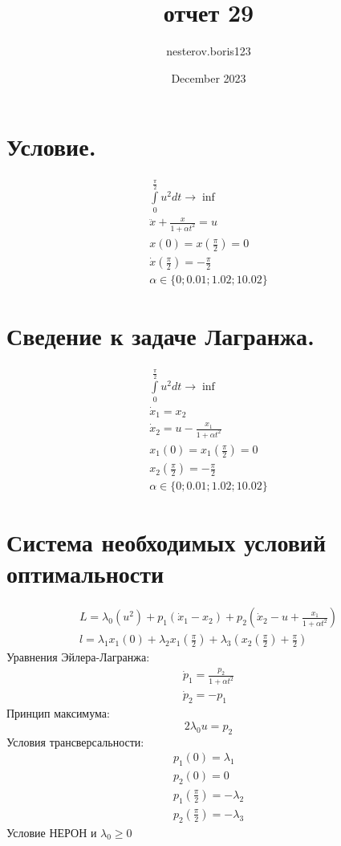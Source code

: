 \documentclass{article}
\title{отчет 29}
\author{nesterov.boris123 }
\date{December 2023}
\begin{document}
\section{Условие.}
\begin{gather*}
 \int\limits_{0}^{\frac \pi 2}u^{2} dt \rightarrow \inf\\
 \ddot x + \frac{x}{1 + \alpha t^{2}} = u\\
  x(0) = x(\frac \pi 2) = 0\\
  \dot{x}(\frac \pi 2) = -\frac \pi 2\\
  \alpha \in \{0;0.01;1.02;10.02\}
\end{gather*}
\section{Сведение к задаче Лагранжа.}
\begin{gather*}
 \int\limits_{0}^{\frac \pi 2}u^{2} dt \rightarrow \inf\\
 \dot x_{1} = x_{2}\\
 \dot x_{2} = u - \frac{x_{1}}{1 + \alpha t^{2}}\\
  x_{1}(0) = x_{1}(\frac \pi 2) = 0\\
  x_{2}(\frac \pi 2) = -\frac \pi 2\\
  \alpha \in \{0;0.01;1.02;10.02\}
\end{gather*}
\section{Система необходимых условий оптимальности}
\begin{gather*}
  L = \lambda_{0}\left(u^{2}\right) + p_{1}(\dot x_{1} - x_{2}) + p_{2}\left(\dot x_{2} - u + \frac{x_{1}}{1 + \alpha t^{2}}\right)\\
  l = \lambda_{1}x_{1}(0) + \lambda_{2}x_{1}\left(\frac \pi 2\right) + \lambda_{3}\left(x_{2}(\frac \pi 2) + \frac \pi 2\right)
\end{gather*}
Уравнения Эйлера-Лагранжа:
\begin{gather*}
  \dot p_{1} = \frac{p_{2}}{1 + \alpha t^{2}}\\
  \dot p_{2} = -p_{1}
\end{gather*}
Принцип максимума:
$$2\lambda_{0}u = p_{2}$$
Условия трансверсальности:
\begin{gather*}
  p_{1}(0) = \lambda_{1}\\
  p_{2}(0) = 0\\
  p_{1}(\frac \pi 2) = -\lambda_{2}\\
  p_{2}(\frac \pi 2) = -\lambda_{3}
\end{gather*}
Условие НЕРОН и $\lambda_{0} \ge 0$
\end{document}
